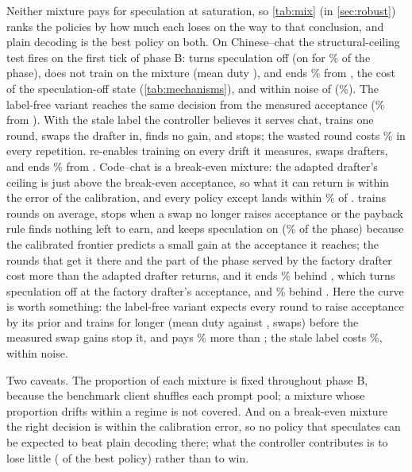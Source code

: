 Neither mixture pays for speculation at saturation, so \cref{tab:mix} (in \cref{sec:robust}) ranks the policies by how much each loses on the way to that conclusion, and plain decoding is the best policy on both. On Chinese--chat the structural-ceiling test fires on the first tick of phase B:  turns speculation off (on for \% of the phase), does not train on the mixture (mean duty ), and ends \% from , the cost of the speculation-off state (\cref{tab:mechanisms}), and within noise of  (\%). The label-free variant reaches the same decision from the measured acceptance (\% from ). With the stale label the controller believes it serves chat, trains one round, swaps the drafter in, finds no gain, and stops; the wasted round costs \% in every repetition.  re-enables training on every drift it measures, swaps  drafters, and ends \% from . Code--chat is a break-even mixture: the adapted drafter's ceiling is just above the break-even acceptance, so what it can return is within the error of the calibration, and every policy except  lands within \% of .  trains  rounds on average, stops when a swap no longer raises acceptance or the payback rule finds nothing left to earn, and keeps speculation on (\% of the phase) because the calibrated frontier predicts a small gain at the acceptance it reaches; the rounds that get it there and the part of the phase served by the factory drafter cost more than the adapted drafter returns, and it ends \% behind , which turns speculation off at the factory drafter's acceptance, and \% behind . Here the curve is worth something: the label-free variant expects every round to raise acceptance by its prior and trains for longer (mean duty  against ,  swaps) before the measured swap gains stop it, and pays \% more than ; the stale label costs \%, within noise.

Two caveats. The proportion of each mixture is fixed throughout phase B, because the benchmark client shuffles each prompt pool; a mixture whose proportion drifts within a regime is not covered. And on a break-even mixture the right decision is within the calibration error, so no policy that speculates can be expected to beat plain decoding there; what the controller contributes is to lose little ( of the best policy) rather than to win.
